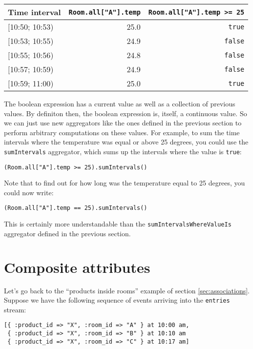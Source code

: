 \documentclass{report}
\begin{document}
\begin{tabular}{ |l|r|r| }
  \hline
  Time interval & \verb=Room.all["A"].temp= & \verb!Room.all["A"].temp >= 25! \\
  \hline
  $[$10:50; 10:53) & 25.0 & \verb=true=  \\
  $[$10:53; 10:55) & 24.9 & \verb=false= \\
  $[$10:55; 10:56) & 24.8 & \verb=false= \\
  $[$10:57; 10:59) & 24.9 & \verb=false= \\
  $[$10:59; 11:00) & 25.0 & \verb=true=  \\
  \hline
\end{tabular}

The boolean expression has a current value as well as a collection of
previous values. By definiton then, the boolean expression is, itself,
a continuous value. So we can just use new aggregators like the ones
defined in the previous section to perform arbitrary computations on
these values. For example, to sum the time intervals where the
temperature was equal or above 25 degrees, you could use the
\verb=sumIntervals= aggregator, which sums up the intervals where the
value is \verb=true=:

\begin{verbatim}
(Room.all["A"].temp >= 25).sumIntervals()
\end{verbatim}

Note that to find out for how long was the temperature equal to 25
degrees, you could now write:

\begin{verbatim}
(Room.all["A"].temp == 25).sumIntervals()
\end{verbatim}


This is certainly more understandable than the
\verb=sumIntervalsWhereValueIs= aggregator defined in the previous
section.

\section{Composite attributes}

Let's go back to the ``products inside rooms'' example of section
\ref{sec:associations}. Suppose we have the following sequence of
events arriving into the \verb=entries= stream:

\begin{verbatim}
[{ :product_id => "X", :room_id => "A" } at 10:00 am,
 { :product_id => "X", :room_id => "B" } at 10:10 am
 { :product_id => "X", :room_id => "C" } at 10:17 am]
\end{verbatim}
\end{document}
